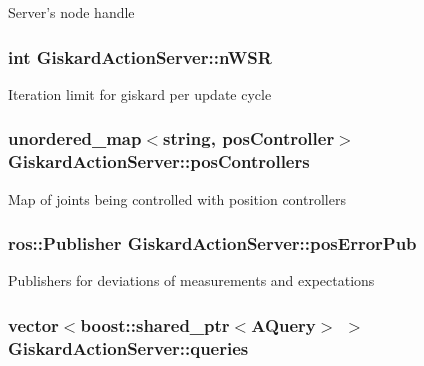 Server's node handle \hypertarget{classGiskardActionServer_a027ef896e1d60656dc32b7fd827e00c1}{
\subsubsection[{n\-W\-S\-R}]{\setlength{\rightskip}{0pt plus 5cm}int Giskard\-Action\-Server\-::n\-W\-S\-R\hspace{0.3cm}{\ttfamily [protected]}}}\label{classGiskardActionServer_a027ef896e1d60656dc32b7fd827e00c1}
Iteration limit for giskard per update cycle \hypertarget{classGiskardActionServer_a972ee6ac1c1295b7c183cfea96ee4db1}{
\subsubsection[{pos\-Controllers}]{\setlength{\rightskip}{0pt plus 5cm}unordered\-\_\-map$<$string, {\bf pos\-Controller}$>$ Giskard\-Action\-Server\-::pos\-Controllers\hspace{0.3cm}{\ttfamily [protected]}}}\label{classGiskardActionServer_a972ee6ac1c1295b7c183cfea96ee4db1}
Map of joints being controlled with position controllers \hypertarget{classGiskardActionServer_ac3e0344ceea38b8113c364b34c2353b2}{
\subsubsection[{pos\-Error\-Pub}]{\setlength{\rightskip}{0pt plus 5cm}ros\-::\-Publisher Giskard\-Action\-Server\-::pos\-Error\-Pub\hspace{0.3cm}{\ttfamily [private]}}}\label{classGiskardActionServer_ac3e0344ceea38b8113c364b34c2353b2}
Publishers for deviations of measurements and expectations \hypertarget{classGiskardActionServer_ae8224875f2c3e1cba7f38a05c2d8985a}{
\subsubsection[{queries}]{\setlength{\rightskip}{0pt plus 5cm}vector$<$boost\-::shared\-\_\-ptr$<${\bf A\-Query}$>$ $>$ Giskard\-Action\-Server\-::queries\hspace{0.3cm}{\ttfamily [protected]}}}\label{classGiskardActionServer_ae8224875f2c3e1cba7f38a05c2d8985a}

